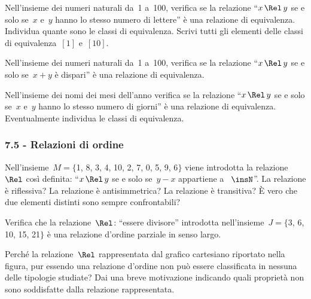 \begin{multicols}{2}
\begin{esercizio}
\label{ese:7.35}
Nell'insieme dei numeri naturali da~1 a~100, verifica se la relazione ``$x \,\Rel\, y$ se e solo se~$x$ e~$y$ hanno lo stesso numero di lettere''
è una relazione di equivalenza. Individua quante sono le classi di equivalenza.
Scrivi tutti gli elementi delle classi di equivalenza~$[1]$ e~$[10]$.
\end{esercizio}

\begin{esercizio}
\label{ese:7.36}
Nell'insieme dei numeri naturali da~1 a~100, verifica se la relazione ``$x \,\Rel\, y$ se e solo se~$x+y$ è
dispari'' è una relazione di equivalenza.
\end{esercizio}

\begin{esercizio}
\label{ese:7.37}
Nell'insieme dei nomi dei mesi dell'anno verifica se la relazione ``$x \,\Rel\, y$ se e solo se~$x$ e~$y$ hanno lo stesso numero di giorni''
è una relazione di equivalenza. Eventualmente individua le classi di equivalenza.
\end{esercizio}

\subsubsection*{7.5 - Relazioni di ordine}
\begin{esercizio}
\label{ese:7.38}
Nell'insieme~$M =\{$1, 8, 3, 4, 10, 2, 7, 0, 5, 9, 6$\}$ viene introdotta la relazione~$\Rel$ così definita: ``$x \,\Rel\, y$ se e solo se~$y-x$ appartiene a ~$\insN$''.
La relazione è riflessiva? La relazione è antisimmetrica? La relazione è transitiva? \`E vero che due elementi
distinti sono sempre confrontabili?
\end{esercizio}

\begin{esercizio}
\label{ese:7.39}
Verifica che la relazione~$\Rel$: ``essere divisore'' introdotta nell'insieme~$J =\{$3, 6, 10, 15, 21$\}$ è una relazione d'ordine parziale in senso largo.
\end{esercizio}

\begin{esercizio}
\label{ese:7.40}
Perché la relazione~$\Rel$ rappresentata dal grafico cartesiano riportato nella figura, %
pur essendo una relazione d'ordine non può essere
classificata in nessuna delle tipologie studiate? Dai una breve motivazione indicando quali proprietà non sono soddisfatte dalla relazione rappresentata.
\begin{center}

\end{center}
\end{esercizio}


\end{multicols}
